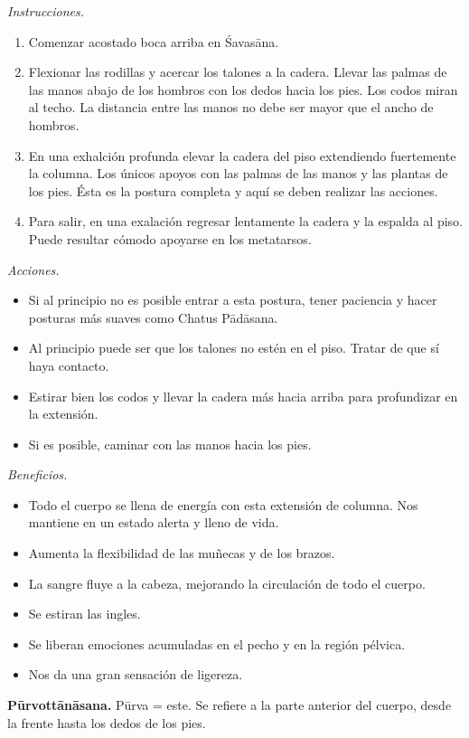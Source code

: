 \emph{Instrucciones.}
\begin{enumerate}
\item Comenzar acostado boca arriba en
Śavasāna.
\item Flexionar las rodillas y acercar los
talones a la cadera. Llevar las palmas de las
manos abajo de los hombros con los dedos
hacia los pies. Los codos miran al techo. La
distancia entre las manos no debe ser mayor
que el ancho de hombros.
\item En una exhalción profunda elevar la
cadera del piso extendiendo fuertemente la
columna. Los únicos apoyos con las palmas de
las manos y las plantas de los pies. Ésta es
la postura completa y aquí se deben realizar
las acciones.
\item Para salir, en una exalación regresar
lentamente la cadera y la espalda al piso.
Puede resultar cómodo apoyarse en los
metatarsos.
\end{enumerate}

\emph{Acciones.}
\begin{itemize}
\item Si al principio no es posible entrar a
esta postura, tener paciencia y hacer
posturas más suaves como Chatus Pādāsana.
\item Al principio puede ser que los talones
no estén en el piso. Tratar de que sí haya
contacto.
\item Estirar bien los codos y llevar la
cadera más hacia arriba para profundizar en
la extensión.
\item Si es posible, caminar con las manos
hacia los pies.
\end{itemize}

\emph{Beneficios.}
\begin{itemize}
\item Todo el cuerpo se llena de energía con
esta extensión de columna. Nos mantiene en un
estado alerta y lleno de vida.
\item Aumenta la flexibilidad de las muñecas
y de los brazos.
\item La sangre fluye a la cabeza, mejorando
la circulación de todo el cuerpo.
\item Se estiran las ingles.
\item Se liberan emociones acumuladas en el
pecho y en la región pélvica.
\item Nos da una gran sensación de ligereza.
\end{itemize}

\medskip\noindent\textbf{Pūrvottānāsana.}
Pūrva = este. Se refiere a la parte anterior
del cuerpo, desde la frente hasta los dedos
de los pies.

